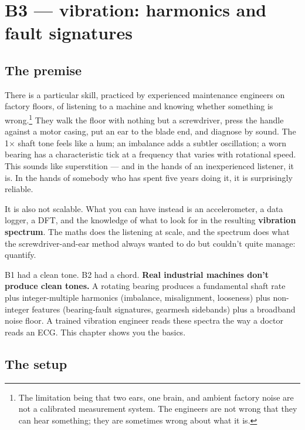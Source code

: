 \documentclass[11pt,a4paper,openany]{book}
\begin{document}
\chapter{B3 --- vibration: harmonics and fault signatures}
\label{ch:b3}

\section{The premise}

There is a particular skill, practiced by experienced maintenance engineers on
factory floors, of listening to a machine and knowing whether something is
wrong.\footnote{The limitation being that two ears, one brain, and ambient
factory noise are not a calibrated measurement system. The engineers are not
wrong that they can hear something; they are sometimes wrong about what it is.}
They walk the floor with nothing but a screwdriver, press the handle against a
motor casing, put an ear to the blade end, and diagnose by sound. The 1$\times$
shaft tone feels like a hum; an imbalance adds a subtler oscillation; a worn
bearing has a characteristic tick at a frequency that varies with rotational
speed. This sounds like superstition --- and in the hands of an inexperienced
listener, it is. In the hands of somebody who has spent five years doing it,
it is surprisingly reliable.

It is also not scalable. What you can have instead is an accelerometer, a data
logger, a DFT, and the knowledge of what to look for in the resulting
\textbf{vibration spectrum}. The maths does the listening at scale, and the
spectrum does what the screwdriver-and-ear method always wanted to do but
couldn't quite manage: quantify.

B1 had a clean tone. B2 had a chord. \textbf{Real industrial machines don't
produce clean tones.} A rotating bearing produces a fundamental shaft rate
plus integer-multiple harmonics (imbalance, misalignment, looseness) plus
non-integer features (bearing-fault signatures, gearmesh sidebands) plus a
broadband noise floor. A trained vibration engineer reads these spectra the
way a doctor reads an ECG. This chapter shows you the basics.

\section{The setup}
\end{document}
